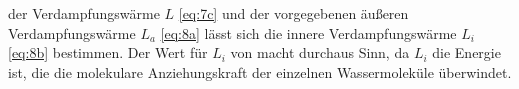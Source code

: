 \justifying der Verdampfungswärme $L$ \eqref{eq:7c} und der vorgegebenen äußeren Verdampfungswärme $L_a$ \eqref{eq:8a} lässt
sich die innere Verdampfungswärme $L_i$ \eqref{eq:8b} bestimmen. Der Wert für $L_i$ von  macht durchaus Sinn, da $L_i$ die Energie ist,
die die molekulare Anziehungskraft der einzelnen Wassermoleküle überwindet. 





\newpage
\printbibliography


